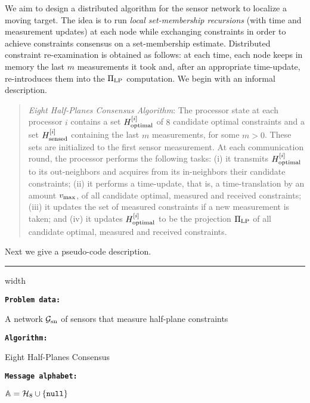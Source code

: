 \documentclass[onecolumn,journal,letterpaper]{IEEEtran}
\newcommand{\subscr}[2]{{#1}_{\textup{#2}}}
\newcommand{\union}{\cup}
\newcommand{\alphabet}{\mathbb{A}}
\newcommand{\vmax}{\subscr{v}{max}}
\newcommand{\Hoptimal}[1]{H^{[#1]}_{\textup{optimal}}}
\newcommand{\Hmeasured}[1]{H^{[#1]}_{\textup{measured}}}
\renewcommand{\Hmeasured}[1]{H^{[#1]}_{\textup{sensed}}}
\newcommand{\GG}{\mathcal{G}}
\newcommand{\HH}{\mathcal{H}}
\newcommand{\nll}{\textup{\texttt{null}}\xspace}
\newcommand{\PiLP}{\Pi_{\textup{LP}}}
\begin{document}
We aim to design a distributed algorithm for the sensor network to localize
a moving target. The idea is to run \emph{local set-membership recursions}
(with time and measurement updates) at each node while exchanging
constraints in order to achieve constraints consensus on a set-membership
estimate.  Distributed constraint re-examination is obtained as follows: at
each time, each node keeps in memory the last $m$ measurements it took and,
after an appropriate time-update, re-introduces them into the $\PiLP$
computation.  We begin with an informal description.
\begin{quote}
  \emph{Eight Half-Planes Consensus Algorithm}: The processor state at each
  processor $i$ contains a set $\Hoptimal{i}$ of $8$ candidate optimal
  constraints and a set $\Hmeasured{i}$ containing the last $m$
  measurements, for some $m>0$. These sets are initialized to the first
  sensor measurement.  At each communication round, the processor performs
  the following tasks: (i) it transmits $\Hoptimal{i}$ to its out-neighbors
  and acquires from its in-neighbors their candidate constraints; (ii) it
  performs a time-update, that is, a time-translation by an amount $\vmax$,
  of all candidate optimal, measured and received constraints; (iii) it
  updates the set of measured constraints if a new measurement is taken;
  and (iv) it updates $\Hoptimal{i}$ to be the projection $\PiLP$ of all
  candidate optimal, measured and received constraints.
\end{quote}

Next we give a pseudo-code description.

\medskip \hrule width \linewidth \smallskip

\noindent\begin{minipage}{0.44\linewidth}\textbf{\texttt{Problem data:}}\end{minipage}\begin{minipage}[t]{0.56\linewidth}A network $\subscr{\GG}{sn}$ of
  sensors that measure half-plane constraints\end{minipage}
\vspace{.05em}

\noindent\begin{minipage}{0.44\linewidth}\textbf{\texttt{Algorithm:}}\end{minipage}\begin{minipage}{0.56\linewidth}Eight Half-Planes Consensus\end{minipage}

\noindent\begin{minipage}{0.44\linewidth}\textbf{\texttt{Message
      alphabet:}}\end{minipage}\begin{minipage}{0.56\linewidth}$\alphabet = \HH_8 \union \{\nll\}$\end{minipage}
\end{document}
